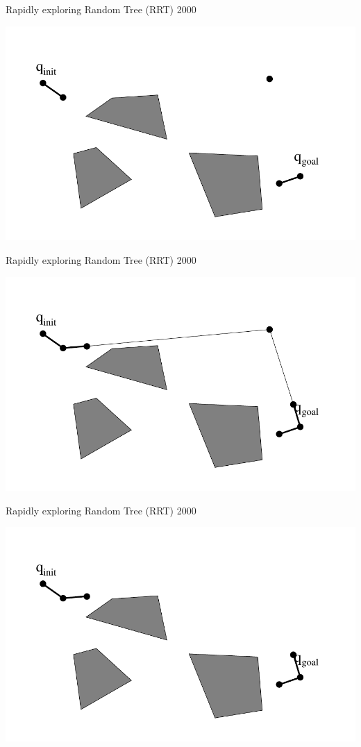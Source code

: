 \begin{frame} {Rapidly exploring Random Tree (RRT) 2000}
\centerline {
  \includegraphics[width=.8\linewidth]{figures/RRT6.pdf}
}
\end{frame}

\begin{frame} {Rapidly exploring Random Tree (RRT) 2000}
\centerline {
  \includegraphics[width=.8\linewidth]{figures/RRT7.pdf}
}
\end{frame}

\begin{frame} {Rapidly exploring Random Tree (RRT) 2000}
\centerline {
  \includegraphics[width=.8\linewidth]{figures/RRT8.pdf}
}
\end{frame}

